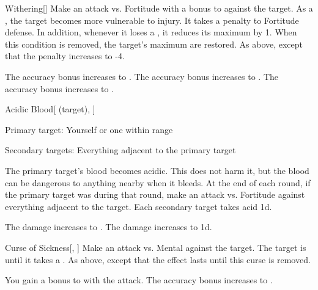 \lowercase{\hypertarget{spell:Withering}{}}\label{spell:Withering}
\begin{freeability}[Rank 1]{\hypertarget{spell:Withering}{Withering}}[]
Make an attack vs. Fortitude with a  bonus to  against the target.
\hit As a , the target becomes more vulnerable to injury.
It takes a  penalty to Fortitude defense.
In addition, whenever it loses a , it reduces its maximum  by 1.
When this condition is removed, the target's maximum  are restored.
\crit As above, except that the penalty increases to -4.

\rankline
{} The accuracy bonus increases to .
 The accuracy bonus increases to .
 The accuracy bonus increases to .
\end{freeability}
\vspace{0.25em}



\lowercase{\hypertarget{spell:Acidic Blood}{}}\label{spell:Acidic Blood}
\begin{attuneability}[Rank 3]{\hypertarget{spell:Acidic Blood}{Acidic Blood}}[ (target), ]

Primary target: Yourself or one  within \rngmed range
\par\noindent
Secondary targets: Everything adjacent to the primary target

The primary target's blood becomes acidic.
This does not harm it, but the blood can be dangerous to anything nearby when it bleeds.
At the end of each round, if the primary target was  during that round, make an attack vs. Fortitude against everything adjacent to the target.
\hit Each secondary target takes acid  \minus1d.

\rankline
{} The damage increases to .
 The damage increases to  \plus1d.
\end{attuneability}
\vspace{0.25em}



\lowercase{\hypertarget{spell:Curse of Sickness}{}}\label{spell:Curse of Sickness}
\begin{freeability}[Rank 3]{\hypertarget{spell:Curse of Sickness}{Curse of Sickness}}[, ]
Make an attack vs. Mental against the target.
\hit The target is  until it takes a .
\crit As above, except that the effect lasts until this curse is removed.

\rankline
{} You gain a  bonus to  with the attack.
 The accuracy bonus increases to .
\end{freeability}
\vspace{0.25em}



